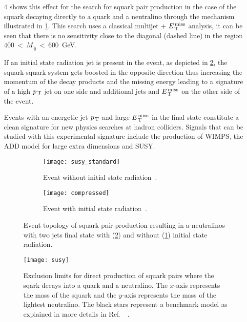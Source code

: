 \cref{fig:susy_exclusion} shows this effect for the search for squark pair
production in the case of the squark decaying directly to a quark and a
neutralino through the mechanism illustrated in \cref{fig:susy_standard}. This
search uses a classical multijet + $E_\mathrm{\, T}^\mathrm{\, miss}$ analysis, it can be seen that there is
no sensitivity close to the diagonal (dashed line) in the region
$400~<~M_{\, \tilde{q}}~<~600$~GeV.

If an initial state radiation jet is present in the event, as depicted in
\cref{fig:susy_compressed}, the squark-squark system gets boosted in the
opposite direction thus increasing the momentum of the decay products and the
missing energy leading to a signature of a high $p_\mathrm{\, T}$ jet on one side and
additional jets and $E_\mathrm{\, T}^\mathrm{\, miss}$ on the other side of the event.

Events with an energetic jet $p_\mathrm{\, T}$ and large $E_\mathrm{\, T}^\mathrm{\, miss}$ in the final state
constitute a clean signature for new physics searches at hadron colliders.
Signals that can be studied with this experimental signature include the
production of WIMPS, the ADD model for large extra dimensions and SUSY\@.
\begin{figure}[!h]
  \centering
  \begin{subfigure}[t]{.48\linewidth}
    \texttt{[image: susy\_standard]}
    \caption{Event without initial state radiation~\cite{SUSYPub}.}
    \label{fig:susy_standard}
  \end{subfigure} \quad
  \begin{subfigure}[t]{.48\linewidth}
    \texttt{[image: compressed]}
    \caption{Event with initial state radiation~\cite{ExotPub}.}
    \label{fig:susy_compressed}
  \end{subfigure}
  \caption{Event topology of squark pair production resulting in a neutralinos
    with two jets final state with (\cref{fig:susy_compressed}) and without
    (\cref{fig:susy_standard}) initial state radiation.}
  \label{fig:motivation}
\end{figure}
\begin{figure}[!htb]
  \centering
  \texttt{[image: susy]}
  \caption{Exclusion limits for direct production of squark
    pairs where the sqark decays into a quark and a neutralino. The $x$-axis
    represents the mass of the squark and the $y$-axis represents the mass of
    the lightest neutralino. The black stars represent a benchmark model as
    explained in more details in Ref.~~\cite{SUSYPub}.}
  \label{fig:susy_exclusion}
\end{figure}
